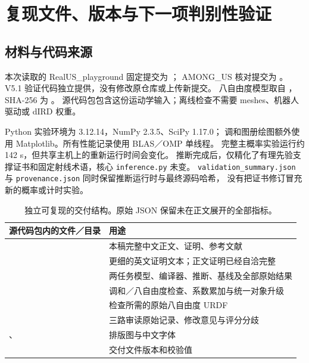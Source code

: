 \documentclass[11pt,a4paper]{article}
\numberwithin{equation}{section}
\theoremstyle{definition}
\begin{document}
\section{复现文件、版本与下一项判别性验证}
\label{app:reproduce}

\subsection{材料与代码来源}
本次读取的 RealUS\_playground 固定提交为
；
AMONG\_US 核对提交为 。
V5.1 验证代码独立提供，没有修改原仓库或上传新提交。
八自由度模型取自
，
SHA-256 为 。
源代码包包含这份运动学输入；离线检查不需要 meshes、机器人驱动或 dIRD 权重。

Python 实验环境为 3.12.14，NumPy 2.3.5、SciPy 1.17.0；
调和图册绘图额外使用 Matplotlib。所有性能记录使用 BLAS／OMP 单线程。
完整主概率实验运行约 142 s，但共享主机上的重新运行时间会变化。
推断完成后，仅精化了有理先验支撑证书和固定射线术语，核心 \texttt{inference.py} 未变。
\texttt{validation\_summary.json} 与 \texttt{provenance.json} 同时保留推断运行时与最终源码哈希，
没有把证书修订冒充新的概率或计时实验。

\begin{table}[ht]
\centering\small
\begin{tabularx}{\linewidth}{p{.43\linewidth}Y}
\toprule
源代码包内的文件／目录 & 用途\\
\midrule
{} & 本稿完整中文正文、证明、参考文献\\
 & 更细的英文证明文本；正文证明已经自洽完整\\
 & 两任务模型、编译器、推断、基线及全部原始结果\\
 & 调和／八自由度检查、系数累加与统一对象升级\\
 & 检查所需的原始八自由度 URDF\\
 & 三路审读原始记录、修改意见与评分分歧\\
、 & 排版图与中文字体\\
 & 交付文件版本和校验值\\
\bottomrule
\end{tabularx}
\caption{独立可复现的交付结构。原始 JSON 保留未在正文展开的全部指标。}
\end{table}
\end{document}
